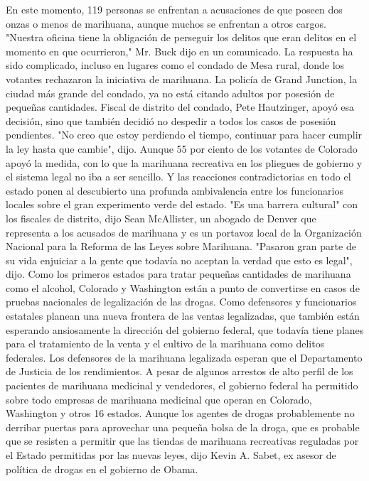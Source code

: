 En este momento, 119 personas se enfrentan a acusaciones de que poseen dos onzas o menos de marihuana, aunque muchos se enfrentan a otros cargos.
"Nuestra oficina tiene la obligación de perseguir los delitos que eran delitos en el momento en que ocurrieron," Mr. Buck dijo en un comunicado.
La respuesta ha sido complicado, incluso en lugares como el condado de Mesa rural, donde los votantes rechazaron la iniciativa de marihuana.
La policía de Grand Junction, la ciudad más grande del condado, ya no está citando adultos por posesión de pequeñas cantidades.
Fiscal de distrito del condado, Pete Hautzinger, apoyó esa decisión, sino que también decidió no despedir a todos los casos de posesión pendientes.
"No creo que estoy perdiendo el tiempo, continuar para hacer cumplir la ley hasta que cambie", dijo.
Aunque 55 por ciento de los votantes de Colorado apoyó la medida, con lo que la marihuana recreativa en los pliegues de gobierno y el sistema legal no iba a ser sencillo.
Y las reacciones contradictorias en todo el estado ponen al descubierto una profunda ambivalencia entre los funcionarios locales sobre el gran experimento verde del estado.
"Es una barrera cultural" con los fiscales de distrito, dijo Sean McAllister, un abogado de Denver que representa a los acusados ​​de marihuana y es un portavoz local de la Organización Nacional para la Reforma de las Leyes sobre Marihuana.
"Pasaron gran parte de su vida enjuiciar a la gente que todavía no aceptan la verdad que esto es legal", dijo.
Como los primeros estados para tratar pequeñas cantidades de marihuana como el alcohol, Colorado y Washington están a punto de convertirse en casos de pruebas nacionales de legalización de las drogas.
Como defensores y funcionarios estatales planean una nueva frontera de las ventas legalizadas, que también están esperando ansiosamente la dirección del gobierno federal, que todavía tiene planes para el tratamiento de la venta y el cultivo de la marihuana como delitos federales.
Los defensores de la marihuana legalizada esperan que el Departamento de Justicia de los rendimientos.
A pesar de algunos arrestos de alto perfil de los pacientes de marihuana medicinal y vendedores, el gobierno federal ha permitido sobre todo empresas de marihuana medicinal que operan en Colorado, Washington y otros 16 estados.
Aunque los agentes de drogas probablemente no derribar puertas para aprovechar una pequeña bolsa de la droga, que es probable que se resisten a permitir que las tiendas de marihuana recreativas reguladas por el Estado permitidas por las nuevas leyes, dijo Kevin A. Sabet, ex asesor de política de drogas en el gobierno de Obama.
